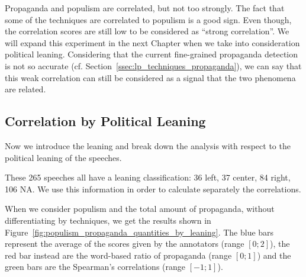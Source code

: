 Propaganda and populism are correlated, but not too strongly.
The fact that some of the techniques are correlated to populism is a good sign. Even though, the correlation scores are still low to be considered as ``strong correlation''. We will expand this experiment in the next Chapter when we take into consideration political leaning.
Considering that the current fine-grained propaganda detection is not so accurate (cf. Section~\ref{ssec:lp_techniques_propaganda}), we can say that this weak correlation can still be considered as a signal that the two phenomena are related.


\subsection{Correlation by Political Leaning}
Now we introduce the leaning and %
break down the analysis with respect to the political leaning of the speeches.

These 265 speeches all have a leaning classification: 36 left, 37 center, 84 right, 106 NA. We use this information in order to calculate separately the correlations.


When we consider populism and the total amount of propaganda, without differentiating by techniques, we get the results shown in Figure~\ref{fig:populism_propaganda_quantities_by_leaning}. The blue bars represent the average of the scores given by the annotators (range $[0;2]$), the red bar instead are the word-based ratio of propaganda (range $[0;1]$) and the green bars are the Spearman's correlations (range $[-1;1]$).

